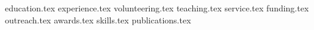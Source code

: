 \documentclass[a4paper,9.5pt]{article}
\begin{document}

{education.tex}
{experience.tex}
{volunteering.tex}
{teaching.tex}
{service.tex}
{funding.tex}
{outreach.tex}
{awards.tex}
{skills.tex}
{publications.tex}
\end{document}
